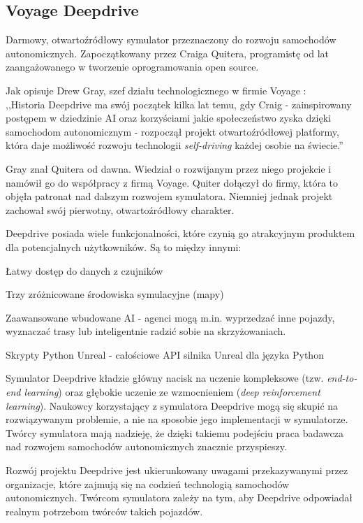 \subsection{Voyage Deepdrive}
Darmowy, otwartoźródłowy symulator przeznaczony do rozwoju samochodów autonomicznych. Zapoczątkowany przez Craiga Quitera, programistę od lat zaangażowanego w tworzenie oprogramowania open source.

Jak opisuje Drew Gray, szef działu technologicznego \cite{investopedia:CTO} w firmie Voyage \cite{voyage:introducingDeepdrive}: \\
,,Historia Deepdrive ma swój początek kilka lat temu, gdy Craig - zainspirowany postępem w dziedzinie AI oraz korzyściami jakie społeczeństwo zyska dzięki samochodom autonomicznym - rozpoczął projekt otwartoźródłowej platformy, która daje możliwość rozwoju technologii \textit{self-driving} każdej osobie na świecie.''

Gray znał Quitera od dawna. Wiedział o rozwijanym przez niego projekcie i namówił go do współpracy z firmą Voyage. Quiter dołączył do firmy, która to objęła patronat nad dalszym rozwojem symulatora. Niemniej jednak projekt zachował swój pierwotny, otwartoźródłowy charakter.

Deepdrive posiada wiele funkcjonalności, które czynią go atrakcyjnym produktem dla potencjalnych użytkowników. Są to między innymi:
\begin{itemize*}
\item Łatwy dostęp do danych z czujników
\item Trzy zróżnicowane środowiska symulacyjne (mapy)
\item Zaawansowane wbudowane AI - agenci mogą m.in. wyprzedzać inne pojazdy, wyznaczać trasy lub inteligentnie radzić sobie na skrzyżowaniach.
\item Skrypty Python Unreal - całościowe API silnika Unreal \cite{unrealEngine:features} dla języka Python
\end{itemize*}

Symulator Deepdrive kładzie główny nacisk na uczenie kompleksowe (tzw. \textit{end-to-end learning}) oraz głębokie uczenie ze wzmocnieniem (\textit{deep reinforcement learning}). Naukowcy korzystający z symulatora Deepdrive mogą się skupić na rozwiązywanym problemie, a nie na sposobie jego implementacji w symulatorze. Twórcy symulatora mają nadzieję, że dzięki takiemu podejściu praca badawcza nad rozwojem samochodów autonomicznych znacznie przyspieszy.

Rozwój projektu Deepdrive jest ukierunkowany uwagami przekazywanymi przez organizacje, które zajmują się na codzień technologią samochodów autonomicznych. Twórcom symulatora zależy na tym, aby Deepdrive odpowiadał realnym potrzebom twórców takich pojazdów.


